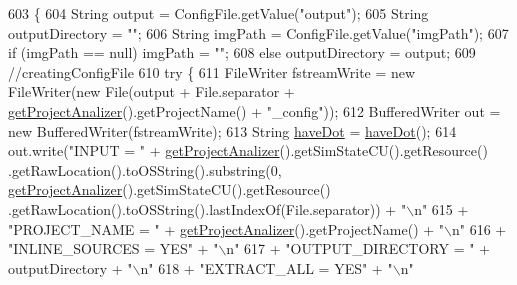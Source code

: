 \begin{DoxyCode}
603                                       \{
604         String output = ConfigFile.getValue(\textcolor{stringliteral}{"output"});
605         String outputDirectory = \textcolor{stringliteral}{""};
606         String imgPath = ConfigFile.getValue(\textcolor{stringliteral}{"imgPath"});
607         \textcolor{keywordflow}{if} (imgPath == null)    imgPath = \textcolor{stringliteral}{""};
608         \textcolor{keywordflow}{else}    outputDirectory = output;
609         \textcolor{comment}{//creatingConfigFile}
610         \textcolor{keywordflow}{try} \{
611             FileWriter fstreamWrite = \textcolor{keyword}{new} FileWriter(\textcolor{keyword}{new} File(output + File.separator + 
      \hyperlink{classit_1_1isislab_1_1masonassisteddocumentation_1_1mason_1_1analizer_1_1_global_utility_a78cbdc6022c558d1375a01095ad95659}{getProjectAnalizer}().getProjectName() + \textcolor{stringliteral}{"\_config"}));
612             BufferedWriter out = \textcolor{keyword}{new} BufferedWriter(fstreamWrite);
613             String \hyperlink{classit_1_1isislab_1_1masonassisteddocumentation_1_1mason_1_1analizer_1_1_global_utility_a396066731dbc923fe85d28988511ba46}{haveDot} = \hyperlink{classit_1_1isislab_1_1masonassisteddocumentation_1_1mason_1_1analizer_1_1_global_utility_a396066731dbc923fe85d28988511ba46}{haveDot}();
614             out.write(\textcolor{stringliteral}{"INPUT = "} + \hyperlink{classit_1_1isislab_1_1masonassisteddocumentation_1_1mason_1_1analizer_1_1_global_utility_a78cbdc6022c558d1375a01095ad95659}{getProjectAnalizer}().getSimStateCU().getResource()
      .getRawLocation().toOSString().substring(0, \hyperlink{classit_1_1isislab_1_1masonassisteddocumentation_1_1mason_1_1analizer_1_1_global_utility_a78cbdc6022c558d1375a01095ad95659}{getProjectAnalizer}().getSimStateCU().getResource()
      .getRawLocation().toOSString().lastIndexOf(File.separator)) + \textcolor{stringliteral}{"\(\backslash\)n"}
615                     + \textcolor{stringliteral}{"PROJECT\_NAME = "} + \hyperlink{classit_1_1isislab_1_1masonassisteddocumentation_1_1mason_1_1analizer_1_1_global_utility_a78cbdc6022c558d1375a01095ad95659}{getProjectAnalizer}().getProjectName() + \textcolor{stringliteral}{"\(\backslash\)n"}
616                     + \textcolor{stringliteral}{"INLINE\_SOURCES = YES"} + \textcolor{stringliteral}{"\(\backslash\)n"}
617                     + \textcolor{stringliteral}{"OUTPUT\_DIRECTORY = "} + outputDirectory + \textcolor{stringliteral}{"\(\backslash\)n"}
618                     + \textcolor{stringliteral}{"EXTRACT\_ALL = YES"} + \textcolor{stringliteral}{"\(\backslash\)n"}

\end{DoxyCode}
